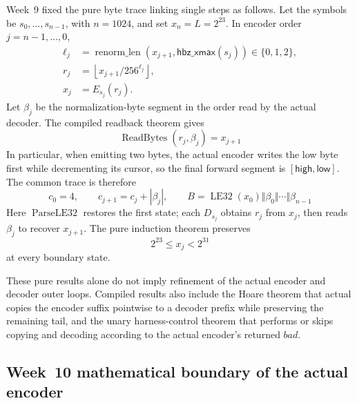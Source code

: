 Week~9 fixed the pure byte trace linking single steps as follows. Let the
symbols be \(s_0,\ldots,s_{n-1}\), with \(n=1024\), and set
\(x_n=L=2^{23}\). In encoder order \(j=n-1,\ldots,0\),
\[
\begin{aligned}
  \ell_j&=\operatorname{renorm\_len}
      (x_{j+1},\mathsf{hbz\_xmax}(s_j))\in\{0,1,2\},\\
  r_j&=\left\lfloor x_{j+1}/256^{\ell_j}\right\rfloor,\\
  x_j&=E_{s_j}(r_j).
\end{aligned}
\]
Let \(\beta_j\) be the normalization-byte segment in the order read by the
actual decoder. The compiled readback theorem gives
\[
  \operatorname{ReadBytes}(r_j,\beta_j)=x_{j+1}
\]
In particular, when emitting two bytes, the actual encoder writes the low
byte first while decrementing its cursor, so the final forward segment is
\([\mathsf{high},\mathsf{low}]\). The common trace is therefore
\[
  c_0=4,\qquad c_{j+1}=c_j+|\beta_j|,
  \qquad
  B=\operatorname{LE32}(x_0)\Vert\beta_0\Vert\cdots\Vert\beta_{n-1}
\]
Here \(\operatorname{ParseLE32}\) restores the first state; each
\(D_{s_j}\) obtains \(r_j\) from \(x_j\), then reads \(\beta_j\) to recover
\(x_{j+1}\). The pure induction theorem preserves
\[
  2^{23}\le x_j<2^{31}
\]
at every boundary state.

These pure results alone do not imply refinement of the actual encoder and
decoder outer loops. Compiled results also include the Hoare theorem that
actual  copies the encoder suffix pointwise
to a decoder prefix while preserving the remaining tail, and the unary
harness-control theorem that performs or skips copying and decoding according
to the actual encoder's returned \(bad\).

\subsection{Week~10 mathematical boundary of the actual encoder}

